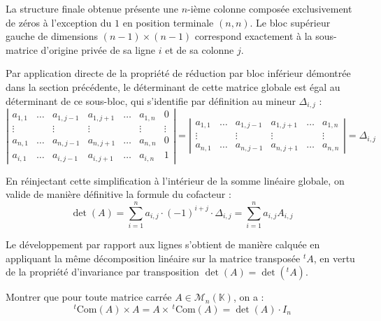 \documentclass[11pt, a4paper]{article}
\theoremstyle{definition}
\begin{document}
La structure finale obtenue présente une $n$-ième colonne composée exclusivement de zéros à l'exception du $1$ en position terminale $(n,n)$. Le bloc supérieur gauche de dimensions $(n-1) \times (n-1)$ correspond exactement à la sous-matrice d'origine privée de sa ligne $i$ et de sa colonne $j$.

Par application directe de la propriété de réduction par bloc inférieur démontrée dans la section précédente, le déterminant de cette matrice globale est égal au déterminant de ce sous-bloc, qui s'identifie par définition au mineur $\Delta_{i,j}$ :
$$\left|\begin{matrix} 
	a_{1,1} & \dots & a_{1,j-1} & a_{1,j+1} & \dots & a_{1,n} & 0 \\
	\vdots & & \vdots & \vdots & & \vdots & \vdots \\
	a_{n,1} & \dots & a_{n,j-1} & a_{n,j+1} & \dots & a_{n,n} & 0 \\
	a_{i,1} & \dots & a_{i,j-1} & a_{i,j+1} & \dots & a_{i,n} & 1
\end{matrix}\right| = \left|\begin{matrix} 
	a_{1,1} & \dots & a_{1,j-1} & a_{1,j+1} & \dots & a_{1,n} \\
	\vdots & & \vdots & \vdots & & \vdots \\
	a_{n,1} & \dots & a_{n,j-1} & a_{n,j+1} & \dots & a_{n,n}
\end{matrix}\right| = \Delta_{i,j}$$

En réinjectant cette simplification à l'intérieur de la somme linéaire globale, on valide de manière définitive la formule du cofacteur :
$$\det(A) = \sum_{i=1}^n a_{i,j} \cdot (-1)^{i+j} \cdot \Delta_{i,j} = \sum_{i=1}^n a_{i,j} A_{i,j}$$

Le développement par rapport aux lignes s'obtient de manière calquée en appliquant la même décomposition linéaire sur la matrice transposée $^t A$, en vertu de la propriété d'invariance par transposition $\det(A) = \det(^t A)$.

\clearpage

\begin{tcolorbox}[instructionstyle]
	Montrer que pour toute matrice carrée $A \in \mathcal{M}_n(\mathbb{K})$, on a :
	$$\,^t\mathrm{Com}(A) \times A = A \times \,^t\mathrm{Com}(A) = \det(A) \cdot I_n$$
\end{tcolorbox}
\end{document}
